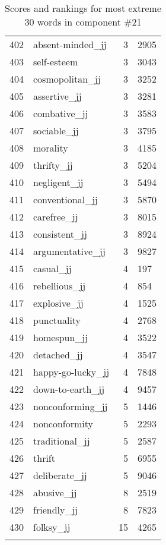 \begin{longtable}[!htbp]{| rlr@{.}l |}
    402 & absent-minded\_jj & 3 & 2905 \\
    403 & self-esteem & 3 & 3043 \\
    404 & cosmopolitan\_jj & 3 & 3252 \\
    405 & assertive\_jj & 3 & 3281 \\
    406 & combative\_jj & 3 & 3583 \\
    407 & sociable\_jj & 3 & 3795 \\
    408 & morality & 3 & 4185 \\
    409 & thrifty\_jj & 3 & 5204 \\
    410 & negligent\_jj & 3 & 5494 \\
    411 & conventional\_jj & 3 & 5870 \\
    412 & carefree\_jj & 3 & 8015 \\
    413 & consistent\_jj & 3 & 8924 \\
    414 & argumentative\_jj & 3 & 9827 \\
    415 & casual\_jj & 4 & 197 \\
    416 & rebellious\_jj & 4 & 854 \\
    417 & explosive\_jj & 4 & 1525 \\
    418 & punctuality & 4 & 2768 \\
    419 & homespun\_jj & 4 & 3522 \\
    420 & detached\_jj & 4 & 3547 \\
    421 & happy-go-lucky\_jj & 4 & 7848 \\
    422 & down-to-earth\_jj & 4 & 9457 \\
    423 & nonconforming\_jj & 5 & 1446 \\
    424 & nonconformity & 5 & 2293 \\
    425 & traditional\_jj & 5 & 2587 \\
    426 & thrift & 5 & 6955 \\
    427 & deliberate\_jj & 5 & 9046 \\
    428 & abusive\_jj & 8 & 2519 \\
    429 & friendly\_jj & 8 & 7823 \\
    430 & folksy\_jj & 15 & 4265 \\
    \hline
    \caption{Scores and rankings for most extreme 30 words in component \#21} \\
\end{longtable}
